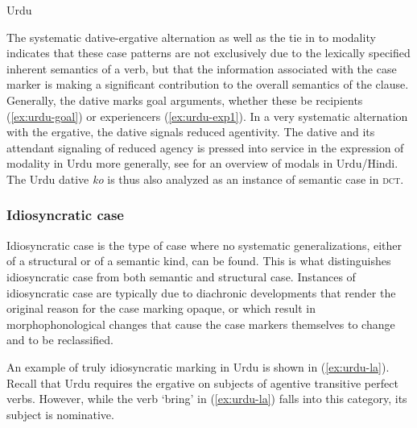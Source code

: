 \documentclass[output=paper,hidelinks]{langscibook}
\begin{document}
\begin{exe}
  \ex \label{ex:urdu-must}
Urdu
  \begin{xlist}

  \end{xlist}
    \end{exe}
The systematic dative-ergative alternation as well as the tie in to modality
indicates that these case patterns are not exclusively due to the lexically specified inherent
semantics of a verb, but that the information associated with the case marker is
making a significant contribution to the overall semantics of the clause.
Generally, the dative marks goal arguments, whether these be recipients 
(\ref{ex:urdu-goal}) or experiencers (\ref{ex:urdu-exp1}).  
In a very systematic alternation with the ergative, the dative 
signals reduced agentivity.  The dative and its attendant signaling of reduced agency is
pressed into service in the expression of modality in Urdu more generally, see
\citet{bhattetal11} for an overview of modals in Urdu/Hindi.  The Urdu dative
{\em ko} is thus also analyzed as an instance of semantic case in \textsc{dct}. 

\subsubsection{Idiosyncratic case}

Idiosyncratic case is the type of case where no systematic generalizations,
either of a structural or of a semantic kind, can be found. This is what
distinguishes idiosyncratic case from both semantic and structural case.
Instances of idiosyncratic case are typically due to diachronic developments
that render the original reason for the case marking opaque, or which result in
morphophonological changes that cause the case markers themselves to change and to
be reclassified.

An example of truly idiosyncratic marking in Urdu is shown in (\ref{ex:urdu-la}).
Recall that Urdu requires the ergative on subjects of agentive transitive
perfect verbs.  However, while the verb `bring' in (\ref{ex:urdu-la}) falls into
this category, its subject is nominative.
\end{document}
